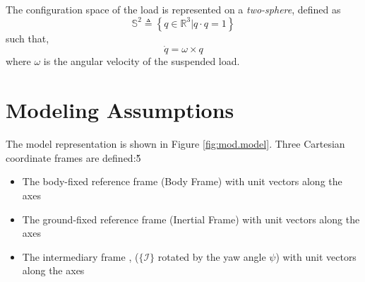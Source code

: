 The configuration space of the load is represented on a \textit{two-sphere}, defined as
\begin{equation}\label{key}
\mathbb{S}^2 \triangleq \left\lbrace q\in\mathbb{R}^{3}|q\cdot q=1\right\rbrace 
\end{equation}
such that,
\begin{equation}\label{key}
\dot{q} = \omega\times q
\end{equation}
where $ \omega $ is the angular velocity of the suspended load.

\section{Modeling Assumptions}\label{sec:mod.assum} 

The  model representation is shown in Figure \ref{fig:mod.model}. Three Cartesian coordinate frames are defined:\v{5}
\begin{itemize}
	\setlength\itemsep{.2pt}
	\item The body-fixed reference frame  (Body Frame)
	\subitem with unit vectors  along the axes
	\item The ground-fixed reference frame  (Inertial Frame)
	\subitem with unit vectors  along the axes								
	\item The intermediary frame , ($ \{\mathcal{I} \}$ rotated by the yaw angle $ \psi $) 
	\subitem with unit vectors  along the axes								
\end{itemize}

